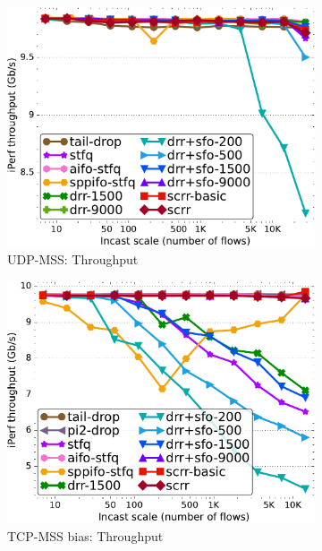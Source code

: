\begin{figure}[th!]
\begin{subfigure}[t]{.30\linewidth}
    \includegraphics[width=0.95\linewidth]{figs/paral_cn_6u4x1024_mss_2500_bw_comp_methods.pdf}
    \caption{UDP-MSS: Throughput}
    \label{fig:fairness-tput-udp-mss-full}
  \end{subfigure}
  \begin{subfigure}[t]{.30\linewidth}
    \centering
    \includegraphics[width=0.95\linewidth]{figs/paral_cn_6t4x1024_mss_2500_bw_comp_methods.pdf}
    \caption{TCP-MSS bias: Throughput}
    \label{fig:fairness-tput-tcp-mss-full}
  \end{subfigure}
  \\
  \begin{subfigure}[t]{.30\linewidth}
    \centering

\end{subfigure}
\end{figure}
